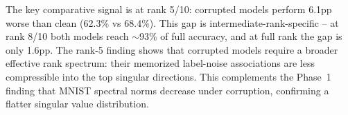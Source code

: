 \documentclass{article}
\begin{document}
The key comparative signal is at rank 5/10: corrupted models perform 6.1pp worse than clean (62.3\% vs 68.4\%). This gap is intermediate-rank-specific -- at rank 8/10 both models reach $\sim$93\% of full accuracy, and at full rank the gap is only 1.6pp. The rank-5 finding shows that corrupted models require a broader effective rank spectrum: their memorized label-noise associations are less compressible into the top singular directions. This complements the Phase~1 finding that MNIST spectral norms decrease under corruption, confirming a flatter singular value distribution.
\end{document}
